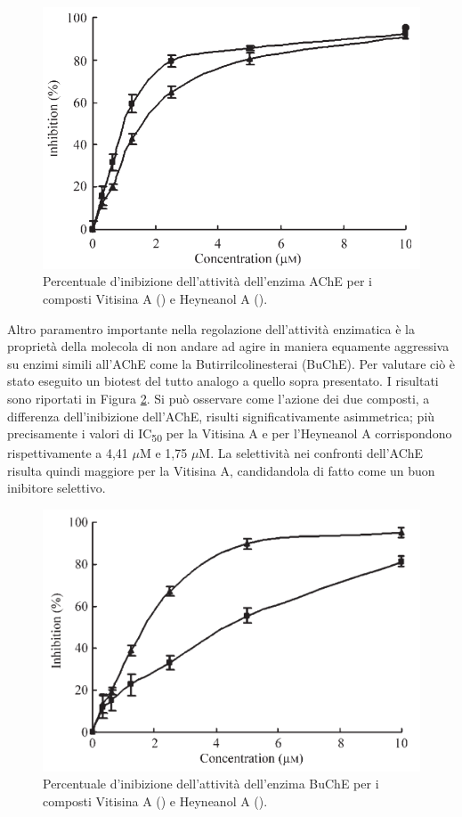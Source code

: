 \documentclass[a4paper, 12pt]{article}
\begin{document}
\begin{figure}[H]
	\centering
	\includegraphics[width=.9\linewidth]{immagini/risache_resveratrolo.png}
	\caption{Percentuale d'inibizione dell'attività dell'enzima AChE per i composti Vitisina A () e Heyneanol A (). }
	\label{fig:risache_resveratrolo}
\end{figure}

Altro paramentro importante nella regolazione dell'attività enzimatica è la proprietà della molecola di non andare ad agire in maniera equamente aggressiva su enzimi simili all'AChE come la Butirrilcolinesterai (BuChE). Per valutare ciò è stato eseguito un biotest del tutto analogo a quello sopra presentato. I risultati sono riportati in Figura \ref{fig:risbuche_resveratrolo}. Si può osservare come l'azione dei due composti, a differenza dell'inibizione dell'AChE, risulti significativamente asimmetrica; più precisamente i valori di IC\textsubscript{50} per la Vitisina A e per l'Heyneanol A corrispondono rispettivamente a 4,41 $\mu$M e 1,75 $\mu$M. La selettività nei confronti dell'AChE risulta quindi maggiore per la Vitisina A, candidandola di fatto come un buon inibitore selettivo. \autocite{jang_inhibition_2008}

\begin{figure}[H]
	\centering
	\includegraphics[width=.9\linewidth]{immagini/risbuche_resveratrolo.png}
	\caption{Percentuale d'inibizione dell'attività dell'enzima BuChE per i composti Vitisina A () e Heyneanol A (). }
	\label{fig:risbuche_resveratrolo}
\end{figure}
\end{document}

